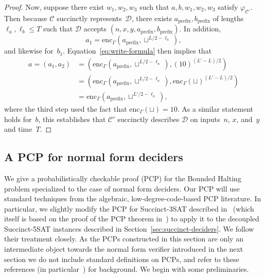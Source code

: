 \documentclass[11pt]{article}
\theoremstyle{definition}
\newcommand{\decider}{\mathcal{D}}
\newcommand{\circuit}{\mathcal{C}}
\begin{document}
\begin{proof}
  Now, suppose there exist $w_1, w_2, w_3$ such that $a, b, w_1, w_2, w_3$
  satisfy $\varphi_{\circuit'}$.
  Then because $\circuit$ succinctly represents~$\decider$, there exists
  $a_{\mathrm{prefix}}, b_{\mathrm{prefix}}$ of lengths $\ell_a, \ell_b \leq T$
  such that $\decider$ accepts $(n, x, y, a_{\mathrm{prefix}},
  b_{\mathrm{prefix}})$.
  In addition,
  \begin{equation*}
    a_1 = \mathrm{enc}_\Gamma(a_{\mathrm{prefix}}, \sqcup^{L/2-\ell_a}),
  \end{equation*}
  and likewise for~$b_1$.
  Equation~\eqref{eq:write-formula} then implies that
  \begin{align*}
    a = (a_1, a_2)
    &= (\mathrm{enc}_\Gamma(a_{\mathrm{prefix}}, \sqcup^{L/2-\ell_a}),
      (10)^{(L' - L)/2})\\
    &= (\mathrm{enc}_\Gamma(a_{\mathrm{prefix}}, \sqcup^{L/2-\ell_a}),
      \mathrm{enc}_\Gamma(\sqcup)^{(L' - L)/2})\\
    &= \mathrm{enc}_\Gamma(a_{\mathrm{prefix}}, \sqcup^{L'/2-\ell_a}),
  \end{align*}
  where the third step used the fact that $\mathrm{enc}_\Gamma(\sqcup) = 10$.
  As a similar statement holds for~$b$, this establishes that $\circuit'$
  succinctly describes $\decider$ on inputs~$n$, $x$, and~$y$ and time~$T$.
\end{proof}

\subsection{A PCP for normal form deciders}
\label{sec:pcp-cktval-new}

We give a probabilistically checkable proof (PCP) for the Bounded Halting
problem specialized to the case of normal form deciders.
Our PCP will use standard techniques from the algebraic, low-degree-code-based
PCP literature.
In particular, we slightly modify the PCP for Succinct-3SAT described
in~\cite[Section 11]{NW19} (which itself is based on the proof of the PCP
theorem in~\cite{harsha2004robust}) to apply it to the decoupled Succinct-5SAT
instances described in Section~\ref{sec:succinct-deciders}.
We follow their treatment closely.
As the PCPs constructed in this section are only an intermediate object towards
the normal form verifier introduced in the next section we do not include
standard definitions on PCPs, and refer to these references (in
particular~\cite{harsha2004robust}) for background.
We begin with some preliminaries.
\end{document}
